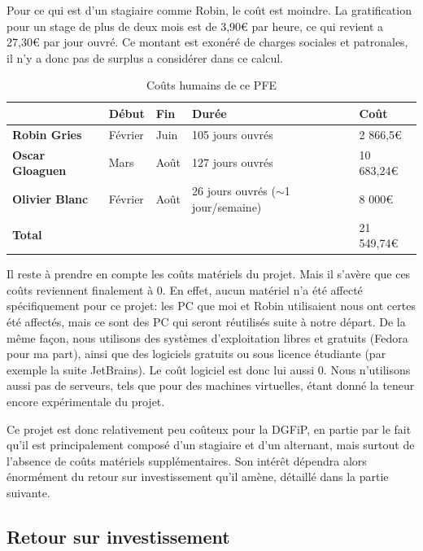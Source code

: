 \documentclass[openany, 11pt]{memoir}
\begin{document}
Pour ce qui est d'un stagiaire comme Robin, le coût est moindre. La gratification pour un stage de plus de deux mois est de 3,90€ par heure, ce qui revient a 27,30€ par jour ouvré. Ce montant est exonéré de charges sociales et patronales, il n'y a donc pas de surplus a considérer dans ce calcul.

\begin{table}[ht]
	\centering
	\begin{tabular}{|l|l|l|l|l|}
		\hline
		& \textbf{Début} & \textbf{Fin} & \textbf{Durée} & \textbf{Coût} \\
		\hline
		\textbf{Robin Gries} & Février & Juin & 105 jours ouvrés & 2 866,5€ \\
		\hline
		\textbf{Oscar Gloaguen} & Mars & Août & 127 jours ouvrés & 10 683,24€ \\
		\hline
		\textbf{Olivier Blanc} & Février & Août & \makecell[l]{26 jours ouvrés \\ ($\sim$1 jour/semaine)} & 8 000€ \\
		\hline \hline
		\multicolumn{4}{|l|}{\textbf{Total}} & 21 549,74€  \\
		\hline
	\end{tabular}
	\caption{Coûts humains de ce PFE}
	\label{couts}
\end{table}

Il reste à prendre en compte les coûts matériels du projet. Mais il s'avère que ces coûts reviennent finalement à 0. En effet, aucun matériel n'a été affecté spécifiquement pour ce projet: les PC que moi et Robin utilisaient nous ont certes été affectés, mais ce sont des PC qui seront réutilisés suite à notre départ. De la même façon, nous utilisons des systèmes d'exploitation libres et gratuits (Fedora pour ma part), ainsi que des logiciels gratuits ou sous licence étudiante (par exemple la suite JetBrains). Le coût logiciel est donc lui aussi 0. Nous n'utilisons aussi pas de serveurs, tels que pour des machines virtuelles, étant donné la teneur encore expérimentale du projet.

Ce projet est donc relativement peu coûteux pour la DGFiP, en partie par le fait qu'il est principalement composé d'un stagiaire et d'un alternant, mais surtout de l'absence de coûts matériels supplémentaires. Son intérêt dépendra alors énormément du retour sur investissement qu'il amène, détaillé dans la partie suivante.

\subsection{Retour sur investissement}
\end{document}
